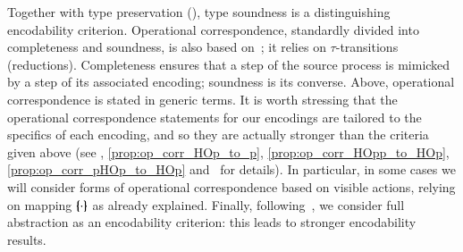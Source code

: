 \documentclass[preprint,11pt]{elsarticle}
\newtheorem{proposition}{Proposition}[section]
\begin{document}
{{%
Together with type preservation (), type soundness is a distinguishing encodability criterion.
Operational correspondence, standardly divided into completeness and soundness, is also based
on~\cite{DBLP:journals/iandc/Gorla10};
it relies on 
$\tau$-transitions (reductions).
Completeness ensures that a step of the source process is mimicked
by a step of its associated encoding; soundness is its converse.
{Above, operational correspondence is stated in generic terms.}
It is worth stressing that 
the operational correspondence statements 
for our encodings 
 are tailored to the specifics of each encoding, and so they
 are actually stronger than the criteria given above
 {(see , \ref{prop:op_corr_HOp_to_p}, \ref{prop:op_corr_HOpp_to_HOp}, \ref{prop:op_corr_pHOp_to_HOp}
 and~\cite{KouzapasPY15} for details).}
 In particular, in some cases we will consider forms of operational correspondence based on visible actions, relying on 
 mapping $\{\!\!\{\cdot\}\!\!\}$ as already explained.
Finally, following~\cite{SangiorgiD:expmpa,DBLP:conf/lics/PalamidessiSVV06,Yoshida96},
we consider full abstraction as an encodability criterion: this leads to 
stronger encodability results. 

%
%

}}
\end{document}
